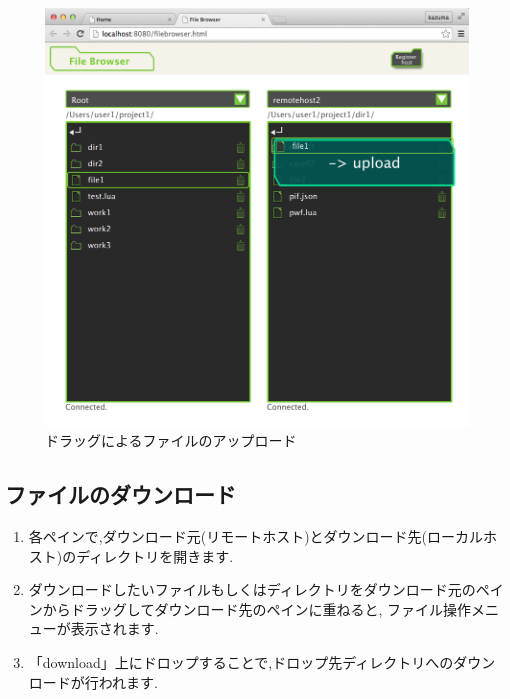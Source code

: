 \documentclass[a4paper,10pt,oneside]{jsbook}
\begin{document}
\begin{figure}[H]
	\begin{center}
		\includegraphics[width=12.0cm]{image/filebrowser_009.png}
	\end{center}
	\caption{ドラッグによるファイルのアップロード}
	\label{fig:filebrowser_fileupload}
\end{figure}

\newpage

\subsection{ファイルのダウンロード}
\begin{enumerate}
	\item 各ペインで,ダウンロード元(リモートホスト)とダウンロード先(ローカルホスト)のディレクトリを開きます.
	\item ダウンロードしたいファイルもしくはディレクトリをダウンロード元のペインからドラッグしてダウンロード先のペインに重ねると,
		  ファイル操作メニューが表示されます.
	\item 「download」上にドロップすることで,ドロップ先ディレクトリへのダウンロードが行われます.
\end{enumerate}
\end{document}
